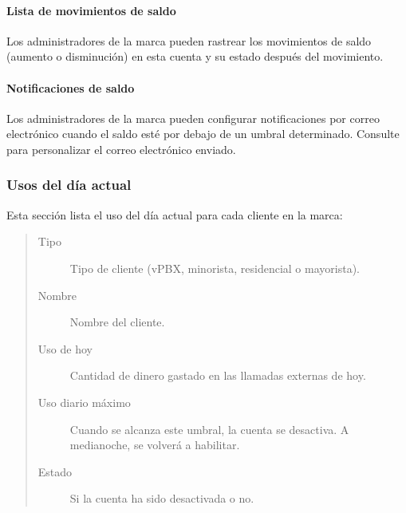 \documentclass[letterpaper,10pt,spanish]{sphinxmanual}
\begin{document}
\paragraph{Lista de movimientos de saldo}
\label{administration_portal/brand/billing/prepaid_balances:balance-movements-list}
Los administradores de la marca pueden rastrear los movimientos de saldo (aumento o disminución) en esta cuenta y su estado después del movimiento.


\paragraph{Notificaciones de saldo}
\label{administration_portal/brand/billing/prepaid_balances:balance-notifications}
Los administradores de la marca pueden configurar notificaciones por correo electrónico cuando el saldo esté por debajo de un umbral determinado. Consulte {\hyperref[administration_portal/brand/settings/notification_templates:id1]{}} para personalizar el correo electrónico enviado.


\subsubsection{Usos del día actual}
\label{administration_portal/brand/billing/current_day_usages:current-day-usages}\label{administration_portal/brand/billing/current_day_usages::doc}\label{administration_portal/brand/billing/current_day_usages:id1}
Esta sección lista el uso del día actual para cada cliente en la marca:
\begin{quote}
\begin{description}
\item[{Tipo}] \leavevmode
Tipo de cliente (vPBX, minorista, residencial o mayorista).

\item[{Nombre}] \leavevmode
Nombre del cliente.

\item[{Uso de hoy}] \leavevmode
Cantidad de dinero gastado en las llamadas externas de hoy.

\item[{Uso diario máximo}] \leavevmode
Cuando se alcanza este umbral, la cuenta se desactiva. A medianoche, se volverá a habilitar.

\item[{Estado}] \leavevmode
Si la cuenta ha sido desactivada o no.

\end{description}
\end{quote}
\end{document}
